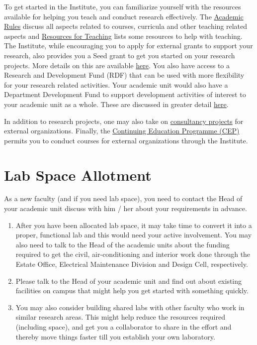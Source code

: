 \documentclass[
  10pt,
  a5paper,
  10pt,
  openany]{amsbook}
\begin{document}
To get started in the Institute, you can familiarize yourself with the
resources available for helping you teach and conduct research
effectively. The \hyperref[sec:acadrules]{Academic Rules} discuss all
aspects related to courses, curricula and other teaching related aspects
and \hyperref[sec:teachingresources]{Resources for Teaching} lists some
resources to help with teaching. The Institute, while encouraging you to
apply for external grants to support your research, also provides you a
Seed grant to get you started on your research projects. More details on
this are available \hyperref[sec:researchfunding]{here}. You also have
access to a Research and Development Fund (RDF) that can be used with
more flexibility for your research related activities. Your academic
unit would also have a Department Development Fund to support
development activities of interest to your academic unit as a whole.
These are discussed in greater detail \hyperref[sec:rdfddf]{here}.

In addition to research projects, one may also take on
\href{sec:consultancy}{consultancy projects} for external organizations.
Finally, the \hyperref[sec:cep]{Continuing Education Programme (CEP)}
permits you to conduct courses for external organizations through the
Institute.

\chapter{Lab Space Allotment}\label{lab-space-allotment}

As a new faculty (and if you need lab space), you need to contact the
Head of your academic unit discuss with him / her about your
requirements in advance.

\begin{enumerate}
\def\labelenumi{\arabic{enumi}.}
\item
  After you have been allocated lab space, it may take time to convert
  it into a proper, functional lab and this would need your active
  involvement. You may also need to talk to the Head of the academic
  units about the funding required to get the civil, air-conditioning
  and interior work done through the Estate Office, Electrical
  Maintenance Division and Design Cell, respectively.
\item
  Please talk to the Head of your academic unit and find out about
  existing facilities on campus that might help you get started with
  something quickly.
\item
  You may also consider building shared labs with other faculty who work
  in similar research areas. This might help reduce the resources
  required (including space), and get you a collaborator to share in the
  effort and thereby move things faster till you establish your own
  laboratory.
\end{enumerate}
\end{document}
